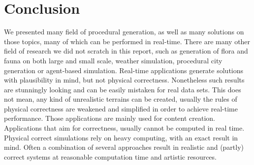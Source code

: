 \section{Conclusion}
We presented many field of procedural generation, as well as many solutions on those topics, many of which can be performed in real-time. There are many other field of research we did not scratch in this report, such as generation of flora and fauna on both large and small scale, weather simulation, procedural city generation or agent-based simulation. Real-time applications generate solutions with plausibility in mind, but not physical correctness. Nonetheless such results are stunningly looking and can be easily mistaken for real data sets. This does not mean, any kind of unrealistic terrains can be created, usually the rules of physical correctness are weakened and simplified in order to achieve real-time performance. Those applications are mainly used for content creation. Applications that aim for correctness, usually cannot be computed in real time. Physical correct simulations rely on heavy computing, with an exact result in mind. Often a combination of several approaches result in realistic and (partly) correct systems at reasonable computation time and artistic resources. 
